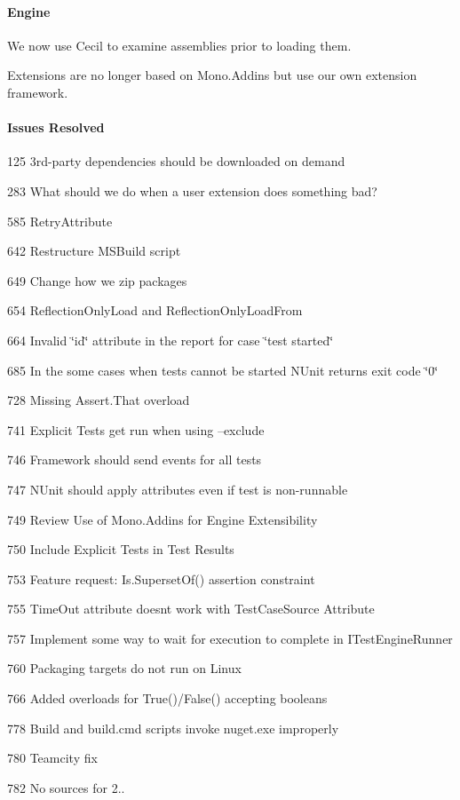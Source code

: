 \paragraph*{Engine}


\begin{DoxyItemize}
\item We now use Cecil to examine assemblies prior to loading them.
\item Extensions are no longer based on Mono.\+Addins but use our own extension framework.
\end{DoxyItemize}

\paragraph*{Issues Resolved}


\begin{DoxyItemize}
\item 125 3rd-\/party dependencies should be downloaded on demand
\item 283 What should we do when a user extension does something bad?
\item 585 Retry\+Attribute
\item 642 Restructure M\+S\+Build script
\item 649 Change how we zip packages
\item 654 Reflection\+Only\+Load and Reflection\+Only\+Load\+From
\item 664 Invalid \char`\"{}id\char`\"{} attribute in the report for case \char`\"{}test started\char`\"{}
\item 685 In the some cases when tests cannot be started N\+Unit returns exit code \char`\"{}0\char`\"{}
\item 728 Missing Assert.\+That overload
\item 741 Explicit Tests get run when using --exclude
\item 746 Framework should send events for all tests
\item 747 N\+Unit should apply attributes even if test is non-\/runnable
\item 749 Review Use of Mono.\+Addins for Engine Extensibility
\item 750 Include Explicit Tests in Test Results
\item 753 Feature request\+: Is.\+Superset\+Of() assertion constraint
\item 755 Time\+Out attribute doesn\textquotesingle{}t work with Test\+Case\+Source Attribute
\item 757 Implement some way to wait for execution to complete in I\+Test\+Engine\+Runner
\item 760 Packaging targets do not run on Linux
\item 766 Added overloads for True()/\+False() accepting booleans
\item 778 Build and build.\+cmd scripts invoke nuget.\+exe improperly
\item 780 Teamcity fix
\item 782 No sources for 2..
\end{DoxyItemize}

